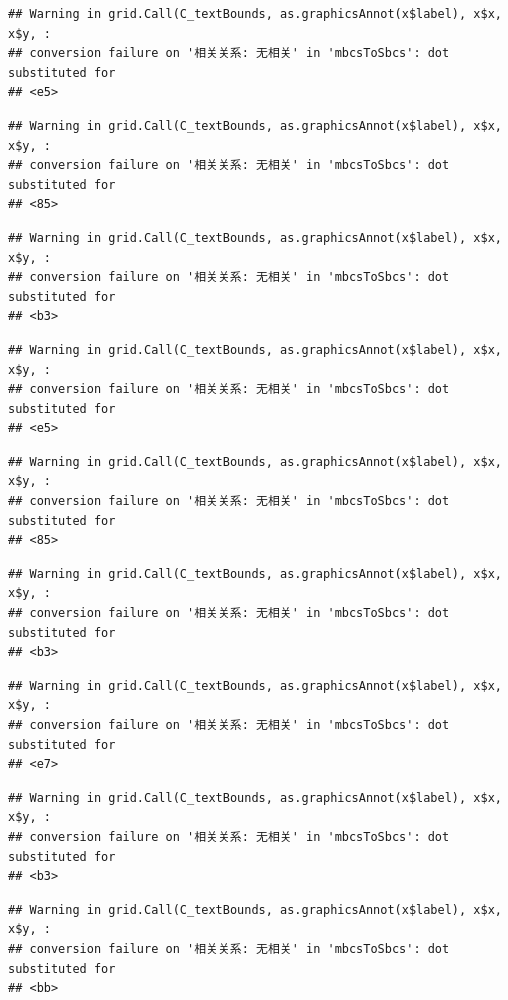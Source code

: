 \documentclass[
]{book}
\begin{document}
\begin{verbatim}
## Warning in grid.Call(C_textBounds, as.graphicsAnnot(x$label), x$x, x$y, :
## conversion failure on '相关关系: 无相关' in 'mbcsToSbcs': dot substituted for
## <e5>
\end{verbatim}

\begin{verbatim}
## Warning in grid.Call(C_textBounds, as.graphicsAnnot(x$label), x$x, x$y, :
## conversion failure on '相关关系: 无相关' in 'mbcsToSbcs': dot substituted for
## <85>
\end{verbatim}

\begin{verbatim}
## Warning in grid.Call(C_textBounds, as.graphicsAnnot(x$label), x$x, x$y, :
## conversion failure on '相关关系: 无相关' in 'mbcsToSbcs': dot substituted for
## <b3>
\end{verbatim}

\begin{verbatim}
## Warning in grid.Call(C_textBounds, as.graphicsAnnot(x$label), x$x, x$y, :
## conversion failure on '相关关系: 无相关' in 'mbcsToSbcs': dot substituted for
## <e5>
\end{verbatim}

\begin{verbatim}
## Warning in grid.Call(C_textBounds, as.graphicsAnnot(x$label), x$x, x$y, :
## conversion failure on '相关关系: 无相关' in 'mbcsToSbcs': dot substituted for
## <85>
\end{verbatim}

\begin{verbatim}
## Warning in grid.Call(C_textBounds, as.graphicsAnnot(x$label), x$x, x$y, :
## conversion failure on '相关关系: 无相关' in 'mbcsToSbcs': dot substituted for
## <b3>
\end{verbatim}

\begin{verbatim}
## Warning in grid.Call(C_textBounds, as.graphicsAnnot(x$label), x$x, x$y, :
## conversion failure on '相关关系: 无相关' in 'mbcsToSbcs': dot substituted for
## <e7>
\end{verbatim}

\begin{verbatim}
## Warning in grid.Call(C_textBounds, as.graphicsAnnot(x$label), x$x, x$y, :
## conversion failure on '相关关系: 无相关' in 'mbcsToSbcs': dot substituted for
## <b3>
\end{verbatim}

\begin{verbatim}
## Warning in grid.Call(C_textBounds, as.graphicsAnnot(x$label), x$x, x$y, :
## conversion failure on '相关关系: 无相关' in 'mbcsToSbcs': dot substituted for
## <bb>
\end{verbatim}
\end{document}
